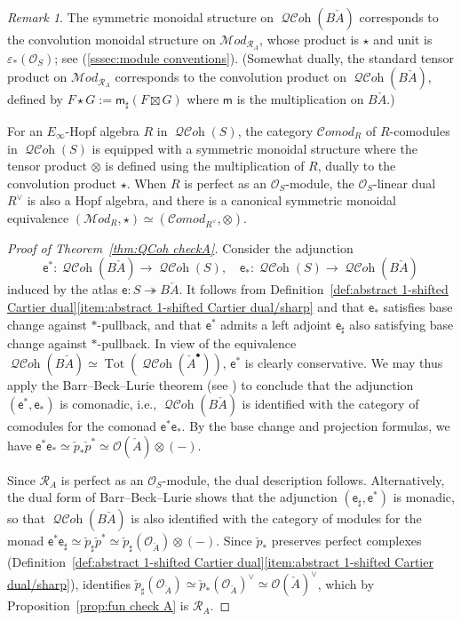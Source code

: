 \documentclass[12pt, oneside]{amsart}
\numberwithin{equation}{section}
\theoremstyle{remark}
\newtheorem{remark}[subsubsection]{Remark}
\theoremstyle{plain}
\newcommand{\MOD}{\mathcal{M}\textit{od}}
\newcommand{\COMOD}{\mathcal{C}\textit{omod}}
\DeclareMathOperator{\QCOH}{\mathcal{QC}\textit{oh}}
\newcommand{\R}{\mathcal{R}}
\newcommand{\RA}{\R_A}
\newcommand{\OO}{\mathcal{O}}
\newcommand{\eps}{\varepsilon}
\newcommand{\sfe}{\mathsf{e}}
\begin{document}
\begin{remark}
The symmetric monoidal structure on $\QCOH(B\check{A})$ corresponds to the convolution monoidal structure on $\MOD_{\RA}$, whose product is $\star$ and unit is $\eps_*(\OO_S)$; see (\ref{sssec:module conventions}).
(Somewhat dually, the standard tensor product on $\MOD_{\RA}$ corresponds to the convolution product on $\QCOH(B\check{A})$, defined by $F \star G := \mathsf{m}_\sharp(F \boxtimes G)$ where $\mathsf{m}$ is the multiplication on $B\check{A}$.)

For an $E_\infty$-Hopf algebra $R$ in $\QCOH(S)$, the category $\COMOD_R$ of $R$-comodules in $\QCOH(S)$ is equipped with a symmetric monoidal structure where the tensor product $\otimes$ is defined using the multiplication of $R$, dually to the convolution product $\star$.
When $R$ is perfect as an $\OO_S$-module, the $\OO_S$-linear dual $R^\vee$ is also a Hopf algebra, and there is a canonical symmetric monoidal equivalence $(\MOD_R, \star) \simeq (\COMOD_{R^\vee}, \otimes)$.
\end{remark}

\begin{proof}[Proof of Theorem~\ref{thm:QCoh checkA}]
  Consider the adjunction
  \[
    \sfe^* : \QCOH(B\check{A}) \to \QCOH(S),
    \quad \sfe_* : \QCOH(S) \to \QCOH(B\check{A})
  \]
  induced by the atlas $\sfe : S \twoheadrightarrow B\check{A}$.
  It follows from Definition~\ref{def:abstract 1-shifted Cartier dual}\ref{item:abstract 1-shifted Cartier dual/sharp} and \cite[Vol.~I, Chap.~1, Lem.~2.6.4]{GR} that $\sfe_*$ satisfies base change against $*$-pullback, and that $\sfe^*$ admits a left adjoint $\sfe_\sharp$ also satisfying base change against $*$-pullback.
  In view of the equivalence $\QCOH(B\check{A}) \simeq \operatorname{Tot}(\QCOH(\check{A}^\bullet))$, $\sfe^*$ is clearly conservative.
  We may thus apply the Barr--Beck--Lurie theorem (see \cite[Thm.~4.7.3.5]{LurieHA}) to conclude that the adjunction $(\sfe^*, \sfe_*)$ is comonadic, i.e., $\QCOH(B\check{A})$ is identified with the category of comodules for the comonad $\sfe^*\sfe_*$.
  By the base change and projection formulas, we have $\sfe^*\sfe_* \simeq \check{p}_*\check{p}^* \simeq \OO(\check{A}) \otimes (-)$.

  Since $\RA$ is perfect as an $\OO_S$-module, the dual description follows.
  Alternatively, the dual form of Barr--Beck--Lurie shows that the adjunction $(\sfe_\sharp, \sfe^*)$ is monadic, so that $\QCOH(B\check{A})$ is also identified with the category of modules for the monad $\sfe^*\sfe_\sharp \simeq \check{p}_\sharp \check{p}^* \simeq \check{p}_\sharp(\OO_{\check{A}}) \otimes (-)$.
  Since $\check{p}_*$ preserves perfect complexes (Definition~\ref{def:abstract 1-shifted Cartier dual}\ref{item:abstract 1-shifted Cartier dual/sharp}), \cite[Rem.~A.4]{weilres} identifies $\check{p}_\sharp(\OO_{\check{A}}) \simeq \check{p}_*(\OO_{\check{A}})^\vee \simeq \OO(\check{A})^\vee$, which by Proposition~\ref{prop:fun check A} is $\RA$.
\end{proof}
\end{document}
